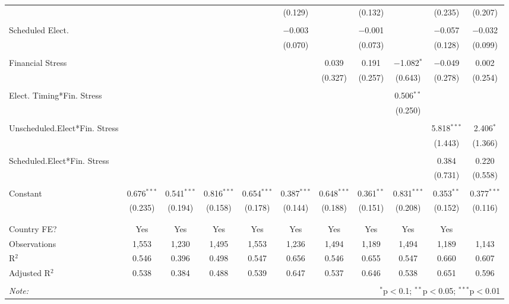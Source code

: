 \begin{table}[!htbp]
\begin{tabular}{@{\extracolsep{5pt}}lcccccccccc}
  &  &  &  &  & (0.129) &  & (0.132) &  & (0.235) & (0.207) \\ 
  & & & & & & & & & & \\ 
 Scheduled Elect. &  &  &  &  & $-$0.003 &  & $-$0.001 &  & $-$0.057 & $-$0.032 \\ 
  &  &  &  &  & (0.070) &  & (0.073) &  & (0.128) & (0.099) \\ 
  & & & & & & & & & & \\ 
 Financial Stress &  &  &  &  &  & 0.039 & 0.191 & $-$1.082$^{*}$ & $-$0.049 & 0.002 \\ 
  &  &  &  &  &  & (0.327) & (0.257) & (0.643) & (0.278) & (0.254) \\ 
  & & & & & & & & & & \\ 
 Elect. Timing*Fin. Stress &  &  &  &  &  &  &  & 0.506$^{**}$ &  &  \\ 
  &  &  &  &  &  &  &  & (0.250) &  &  \\ 
  & & & & & & & & & & \\ 
 Unscheduled.Elect*Fin. Stress &  &  &  &  &  &  &  &  & 5.818$^{***}$ & 2.406$^{*}$ \\ 
  &  &  &  &  &  &  &  &  & (1.443) & (1.366) \\ 
  & & & & & & & & & & \\ 
 Scheduled.Elect*Fin. Stress &  &  &  &  &  &  &  &  & 0.384 & 0.220 \\ 
  &  &  &  &  &  &  &  &  & (0.731) & (0.558) \\ 
  & & & & & & & & & & \\ 
 Constant & 0.676$^{***}$ & 0.541$^{***}$ & 0.816$^{***}$ & 0.654$^{***}$ & 0.387$^{***}$ & 0.648$^{***}$ & 0.361$^{**}$ & 0.831$^{***}$ & 0.353$^{**}$ & 0.377$^{***}$ \\ 
  & (0.235) & (0.194) & (0.158) & (0.178) & (0.144) & (0.188) & (0.151) & (0.208) & (0.152) & (0.116) \\ 
  & & & & & & & & & & \\ 
\hline \\[-1.8ex] 
Country FE? & Yes & Yes & Yes & Yes & Yes & Yes & Yes & Yes & Yes &  \\ 
Observations & 1,553 & 1,230 & 1,495 & 1,553 & 1,236 & 1,494 & 1,189 & 1,494 & 1,189 & 1,143 \\ 
R$^{2}$ & 0.546 & 0.396 & 0.498 & 0.547 & 0.656 & 0.546 & 0.655 & 0.547 & 0.660 & 0.607 \\ 
Adjusted R$^{2}$ & 0.538 & 0.384 & 0.488 & 0.539 & 0.647 & 0.537 & 0.646 & 0.538 & 0.651 & 0.596 \\ 
\hline 
\hline \\[-1.8ex] 
\textit{Note:}  & \multicolumn{10}{r}{$^{*}$p$<$0.1; $^{**}$p$<$0.05; $^{***}$p$<$0.01} \\ 
\end{tabular} 
\end{table} 
